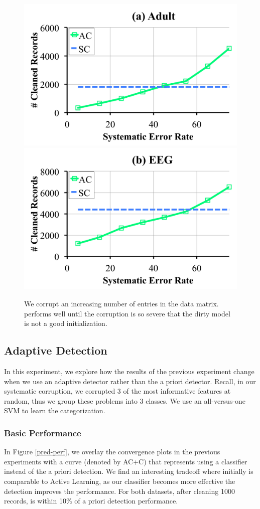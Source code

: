\begin{figure}[ht!]
\centering
 \includegraphics[width=0.49\columnwidth]{exp/exp9a.pdf}
  \includegraphics[width=0.49\columnwidth]{exp/exp9b.pdf}
 \caption{We corrupt an increasing number of entries in the data matrix. \sys performs well until the corruption is so severe that the dirty model is not a good initialization.  \label{bias}}
\end{figure}

\subsection{Adaptive Detection}
In this experiment, we explore how the results of the previous experiment change when we use an adaptive detector rather than the a priori detector.
Recall, in our systematic corruption, we corrupted 3 of the most informative features at random, thus we group these problems into 3 classes.
We use an all-versus-one SVM to learn the categorization.

\subsubsection{Basic Performance}
In Figure \ref{pred-perf}, we overlay the convergence plots in the previous experiments with a curve (denoted by AC+C) that represents \sys using a classifier instead of the a priori detection.
We find an interesting tradeoff where initially \sys is comparable to Active Learning, as our classifier becomes more effective the detection improves the performance.
For both datasets, after cleaning 1000 records, \sys is within 10\% of a priori detection performance.

